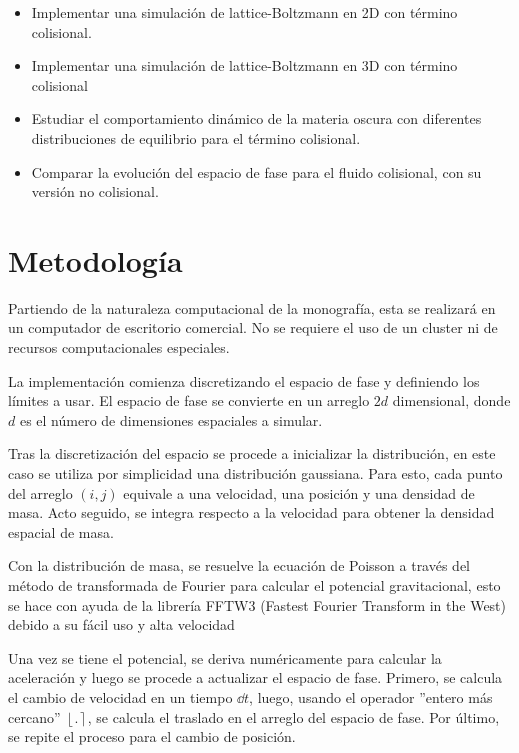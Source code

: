\documentclass[12pt]{article}
\begin{document}

\begin{itemize}
	\item Implementar una simulación de lattice-Boltzmann en 2D con término colisional.
	\item Implementar una simulación de lattice-Boltzmann en 3D con término colisional
	\item Estudiar el comportamiento dinámico de la materia oscura con diferentes distribuciones de equilibrio para el término colisional.
	\item Comparar la evolución del espacio de fase para el fluido colisional, con su versión no colisional.
\end{itemize}

\section{Metodología}

Partiendo de la naturaleza computacional de la monografía, esta se realizará en un computador de escritorio comercial. No se requiere el uso de un cluster ni de recursos computacionales especiales.


La implementación comienza discretizando el espacio de fase y definiendo los límites a usar. El espacio de fase se convierte en un arreglo $2d$ dimensional, donde $d$ es el número de dimensiones espaciales a simular.

Tras la discretización del espacio se procede a inicializar la distribución, en este caso se utiliza por simplicidad una distribución gaussiana. Para esto, cada punto del arreglo $(i,j)$ equivale a una velocidad, una posición y una densidad de masa. Acto seguido, se integra respecto a la velocidad para obtener la densidad espacial de masa.

Con la distribución de masa, se resuelve la ecuación de Poisson a través del método de transformada de Fourier para calcular el potencial gravitacional, esto se hace con ayuda de la librería FFTW3 (Fastest Fourier Transform in the West) debido a    su fácil uso y alta velocidad\cite{franco}

Una vez se tiene el potencial, se deriva numéricamente para calcular la aceleración y luego se procede a actualizar el espacio de fase. Primero, se calcula el cambio de velocidad en un tiempo $\dd t$, luego, usando el operador ''entero más cercano'' $\left\lfloor{.}\right\rceil$, se calcula el traslado en el arreglo del espacio de fase. Por último, se repite el proceso para el cambio de posición.
\end{document}
